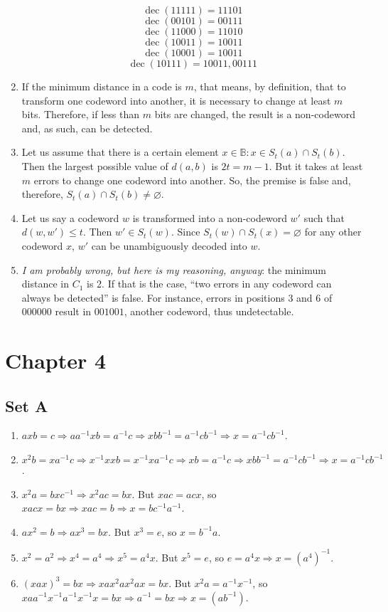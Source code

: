 \documentclass{article}
\let\emptyset\varnothing
\DeclareMathOperator{\dec}{dec}
\begin{document}
\begin{enumerate}
        $$\dec(11111) = 11101$$
        $$\dec(00101) = 00111$$
        $$\dec(11000) = 11010$$
        $$\dec(10011) = 10011$$
        $$\dec(10001) = 10011$$
        $$\dec(10111) = 10011, 00111$$
    \item If the minimum distance in a code is $m$, that means, by definition, that to transform one codeword into another, it is necessary to change at least $m$ bits.
        Therefore, if less than $m$ bits are changed, the result is a non-codeword and, as such, can be detected.
    \item Let us assume that there is a certain element $x \in \mathbb{B}: x \in S_t(a) \cap S_t(b)$.
        Then the largest possible value of $d(a, b)$ is $2t = m - 1$.
        But it takes at least $m$ errors to change one codeword into another. So, the premise is false and, therefore, $S_t(a) \cap S_t(b) \ne \emptyset$.
    \item Let us say a codeword $w$ is transformed into a non-codeword $w'$ such that $d(w, w') \leqslant t$. Then $w' \in S_t(w)$.
        Since $S_t(w) \cap S_t(x) = \emptyset$ for any other codeword $x$, $w'$ can be unambiguously decoded into $w$.
    \item \emph{I am probably wrong, but here is my reasoning, anyway}: the minimum distance in $C_1$ is 2. 
        If that is the case, ``two errors in any codeword can always be detected'' is false. 
        For instance, errors in positions 3 and 6 of $000000$ result in $001001$, another codeword, thus undetectable.
\end{enumerate}

\section*{Chapter 4}
\subsection*{Set A}
\begin{enumerate}
    \item $axb = c \Rightarrow aa^{-1}xb = a^{-1}c \Rightarrow xbb^{-1} = a^{-1}cb^{-1} \Rightarrow x = a^{-1}cb^{-1}$.
    \item $x^2b = xa^{-1}c \Rightarrow x^{-1}xxb = x^{-1}xa^{-1}c \Rightarrow xb = a^{-1}c \Rightarrow xbb^{-1} = a^{-1}cb^{-1} \Rightarrow x = a^{-1}cb^{-1}$.
    \item $x^2a = bxc^{-1} \Rightarrow x^2ac = bx$. But $xac = acx$, so $xacx = bx \Rightarrow xac = b \Rightarrow x = bc^{-1}a^{-1}$.
    \item $ax^2 = b \Rightarrow ax^3 = bx$. But $x^3 = e$, so $x = b^{-1}a$.
    \item $x^2 = a^2 \Rightarrow x^4 = a^4 \Rightarrow x^5 = a^4x$. But $x^5 = e$, so $e = a^4x \Rightarrow x = (a^4)^{-1}$.
    \item $(xax)^3 = bx \Rightarrow xax^2ax^2ax = bx$. But $x^2a = a^{-1}x^{-1}$, so $xaa^{-1}x^{-1}a^{-1}x^{-1}x = bx \Rightarrow a^{-1} = bx \Rightarrow x = (ab^{-1})$.
\end{enumerate}
\end{document}
